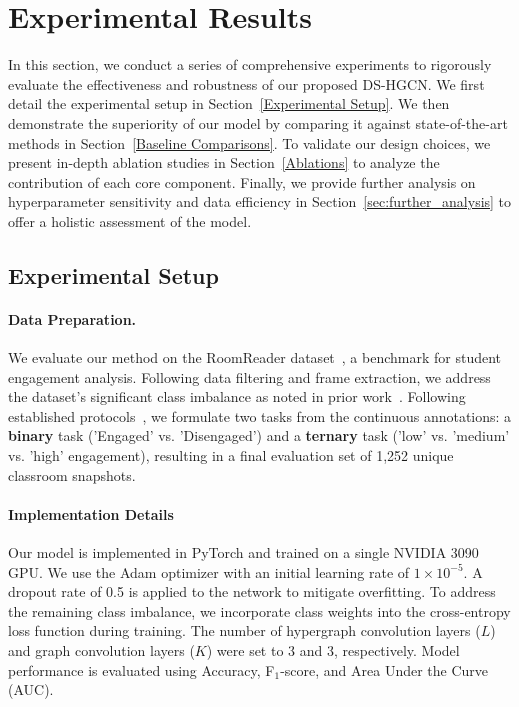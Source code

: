 \documentclass[runningheads]{llncs}
\begin{document}
\section{Experimental Results}{\label{Result}}
In this section, we conduct a series of comprehensive experiments to rigorously evaluate the effectiveness and robustness of our proposed DS-HGCN. We first detail the experimental setup in Section~\ref{Experimental Setup}. We then demonstrate the superiority of our model by comparing it against state-of-the-art methods in Section~\ref{Baseline Comparisons}. To validate our design choices, we present in-depth ablation studies in Section~\ref{Ablations} to analyze the contribution of each core component. Finally, we provide further analysis on hyperparameter sensitivity and data efficiency in Section~\ref{sec:further_analysis} to offer a holistic assessment of the model.


\subsection{Experimental Setup}{\label{Experimental Setup}}


\paragraph{\textbf{Data Preparation.}}
We evaluate our method on the RoomReader dataset~\cite{reverdy2022roomreader}, a benchmark for student engagement analysis. Following data filtering and frame extraction, we address the dataset's significant class imbalance as noted in prior work~\cite{li2024multimodal}. Following established protocols~\cite{li2024multimodal,sumer2021multimodal}, we formulate two tasks from the continuous annotations: a \textbf{binary} task ('Engaged' vs. 'Disengaged') and a \textbf{ternary} task ('low' vs. 'medium' vs. 'high' engagement), resulting in a final evaluation set of 1,252 unique classroom snapshots.


\paragraph{\textbf{Implementation Details}} Our model is implemented in PyTorch and trained on a single NVIDIA 3090 GPU. We use the Adam optimizer with an initial learning rate of $1 \times 10^{-5}$. A dropout rate of 0.5 is applied to the network to mitigate overfitting. To address the remaining class imbalance, we incorporate class weights into the cross-entropy loss function during training. The number of hypergraph convolution layers ($L$) and graph convolution layers ($K$) were set to 3 and 3, respectively. Model performance is evaluated using Accuracy, F$_1$-score, and Area Under the Curve (AUC).
\end{document}
